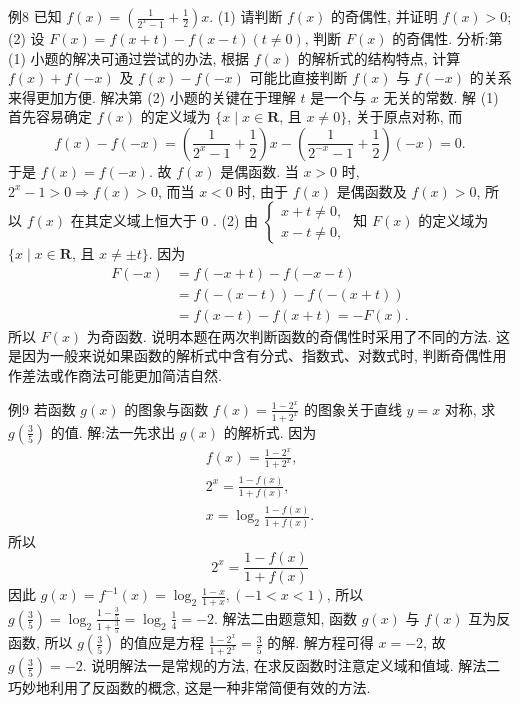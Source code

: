 例8 已知 $f(x)=\left(\frac{1}{2^x-1}+\frac{1}{2}\right) x$.
(1) 请判断 $f(x)$ 的奇偶性, 并证明 $f(x)>0$;
(2) 设 $F(x)=f(x+t)-f(x-t)(t \neq 0)$, 判断 $F(x)$ 的奇偶性.
分析:第(1) 小题的解决可通过尝试的办法, 根据 $f(x)$ 的解析式的结构特点, 计算 $f(x)+f(-x)$ 及 $f(x)-f(-x)$ 可能比直接判断 $f(x)$ 与 $f(-x)$ 的关系来得更加方便.
解决第 (2) 小题的关键在于理解 $t$ 是一个与 $x$ 无关的常数.
解 (1) 首先容易确定 $f(x)$ 的定义域为 $\{x \mid x \in \mathbf{R}$, 且 $x \neq 0\}$, 关于原点对称, 而
$$
f(x)-f(-x)=\left(\frac{1}{2^x-1}+\frac{1}{2}\right) x-\left(\frac{1}{2^{-x}-1}+\frac{1}{2}\right)(-x)=0 .
$$
于是 $f(x)=f(-x)$. 故 $f(x)$ 是偶函数.
当 $x>0$ 时, $2^x-1>0 \Rightarrow f(x)>0$, 而当 $x<0$ 时, 由于 $f(x)$ 是偶函数及 $f(x)>0$, 所以 $f(x)$ 在其定义域上恒大于 0 .
(2) 由 $\left\{\begin{array}{l}x+t \neq 0, \\ x-t \neq 0,\end{array}\right.$ 知 $F(x)$ 的定义域为 $\{x \mid x \in \mathbf{R}$, 且 $x \neq \pm t\}$.
因为
$$
\begin{aligned}
F(-x) & =f(-x+t)-f(-x-t) \\
& =f(-(x-t))-f(-(x+t)) \\
& =f(x-t)-f(x+t)=-F(x) .
\end{aligned}
$$
所以 $F(x)$ 为奇函数.
说明本题在两次判断函数的奇偶性时采用了不同的方法.
这是因为一般来说如果函数的解析式中含有分式、指数式、对数式时, 判断奇偶性用作差法或作商法可能更加简洁自然.



例9 若函数 $g(x)$ 的图象与函数 $f(x)=\frac{1-2^x}{1+2^x}$ 的图象关于直线 $y=x$ 对称, 求 $g\left(\frac{3}{5}\right)$ 的值.
解:法一先求出 $g(x)$ 的解析式.
因为
$$
\begin{gathered}
f(x)=\frac{1-2^x}{1+2^x}, \\
2^x=\frac{1-f(x)}{1+f(x)}, \\
x=\log _2 \frac{1-f(x)}{1+f(x)} .
\end{gathered}
$$
所以
$$
2^x=\frac{1-f(x)}{1+f(x)}
$$
因此 $g(x)=f^{-1}(x)=\log _2 \frac{1-x}{1+x},(-1<x<1)$,
所以 $g\left(\frac{3}{5}\right)=\log _2 \frac{1-\frac{3}{5}}{1+\frac{3}{5}}=\log _2 \frac{1}{4}=-2$.
解法二由题意知, 函数 $g(x)$ 与 $f(x)$ 互为反函数, 所以 $g\left(\frac{3}{5}\right)$ 的值应是方程 $\frac{1-2^x}{1+2^x}=\frac{3}{5}$ 的解.
解方程可得 $x=-2$, 故 $g\left(\frac{3}{5}\right)=-2$.
说明解法一是常规的方法, 在求反函数时注意定义域和值域.
解法二巧妙地利用了反函数的概念, 这是一种非常简便有效的方法.



